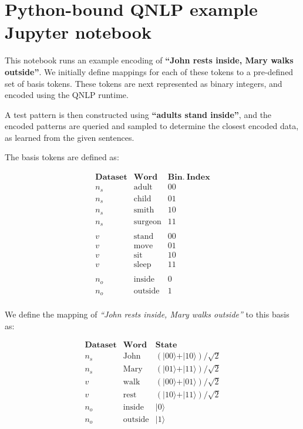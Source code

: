 \hypertarget{qnlp-example}{%
\section{Python-bound QNLP example Jupyter notebook}\label{qnlp-example}}

This notebook runs an example encoding of \textbf{``John rests inside,
Mary walks outside''}. We initially define mappings for each of these
tokens to a pre-defined set of basis tokens. These tokens are next
represented as binary integers, and encoded using the QNLP runtime.

A test pattern is then constructed using \textbf{``adults stand
inside''}, and the encoded patterns are queried and sampled to determine
the closest encoded data, as learned from the given sentences.

The basis tokens are defined as:

\begin{equation*}
\begin{array}{c|c|c}
\mathbf{Dataset} & \mathbf{Word} & \mathbf{Bin.~Index} \\
\hline
{n_s} & \mathrm{adult} & 00 \\
{n_s} & \mathrm{child} & 01 \\
{n_s} & \mathrm{smith} & 10 \\
{n_s} & \mathrm{surgeon} & 11 \\
\\
{v} & \mathrm{stand} & 00 \\
{v} & \mathrm{move} & 01 \\
{v} & \mathrm{sit} & 10 \\
{v} & \mathrm{sleep} & 11 \\
\\
{n_o} & \mathrm{inside} & 0 \\
{n_o} & \mathrm{outside} & 1 \\
\end{array}
\end{equation*}

We define the mapping of \emph{``John rests inside, Mary walks
outside''} to this basis as:

\begin{equation*}
\begin{array}{c|c|c}
\mathbf{Dataset} & \mathbf{Word} & \mathbf{State} \\
\hline
{n_s} & \mathrm{John} & (\vert 00 \rangle + \vert 10 \rangle)/\sqrt{2} \\
{n_s} & \mathrm{Mary} & (\vert 01 \rangle + \vert 11 \rangle)/\sqrt{2} \\
{v} & \mathrm{walk} & (\vert 00 \rangle + \vert 01 \rangle)/\sqrt{2} \\
{v} & \mathrm{rest} & (\vert 10 \rangle + \vert 11 \rangle)/\sqrt{2} \\
{n_o} & \mathrm{inside} & \vert 0 \rangle  \\
{n_o} & \mathrm{outside} & \vert 1 \rangle  \\
\end{array}
\end{equation*}

